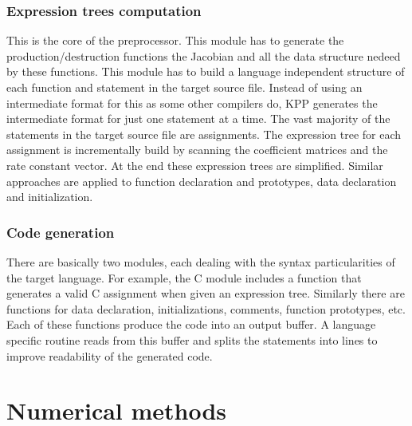 \documentclass[twoside]{article}
\begin{document}
\subsubsection{Expression trees computation}

This is the core of the preprocessor. This module has to generate the
production/destruction functions the Jacobian and all the data
structure nedeed by these functions. This module has to build a language
independent structure of each function and statement in the target
source file. Instead of using an intermediate format for this as some
other compilers do, KPP generates the intermediate format for just one
statement at a time. The vast majority of the statements in the target
source file are assignments. The expression tree for each assignment is
incrementally build by scanning the coefficient matrices and the rate
constant vector. At the end these expression trees are simplified.
Similar approaches are applied to function declaration and prototypes,
data declaration and initialization.

\subsubsection{Code generation}

There are basically two modules, each dealing with the syntax
particularities of the target language. For example, the C module
includes a function that generates a valid C assignment when given an
expression tree. Similarly there are functions for data declaration,
initializations, comments, function prototypes, etc. Each of these
functions produce the code into an output buffer. A language specific
routine reads from this buffer and splits the statements into lines to
improve readability of the generated code.

\section{Numerical methods}
\end{document}
